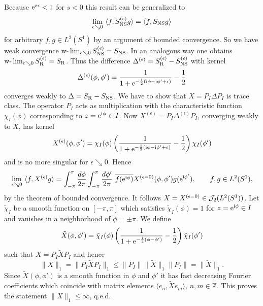 \documentclass[10pt,a4paper]{article}
\begin{document}
Because ${\rm e}^{s\epsilon}<1$ for $s<0$ this result
can be generalized to
\[ \lim_{\epsilon\searrow 0} \,\,
\langle f, S_{\rm NS}^{(\epsilon)} g \rangle =
\langle f, S_{\rm NS} g \rangle \]
for arbitrary $f,g \in L^2(S^1)$ by an argument
of bounded convergence. So we have weak convergence
$\mbox{w-}\lim_{\epsilon\searrow 0}
S_{\rm NS}^{(\epsilon)}=S_{\rm NS}$. In an
analogous way one obtains
$\mbox{w-}\lim_{\epsilon\searrow 0}
S_{\rm R}^{(\epsilon)}=S_{\rm R}$. Thus the
difference $\Delta^{(\epsilon)}=
S_{\rm R}^{(\epsilon)}-S_{\rm NS}^{(\epsilon)}$
with kernel
\[ \Delta^{(\epsilon)}(\phi,\phi')=
\frac{1}{1+{\rm e}^{-\frac{1}{2}({\rm i}\phi-{\rm i}\phi'+\epsilon)}}-
\frac{1}{2} \]
converges weakly to $\Delta=S_{\rm R}-S_{\rm NS}$.
We have to show that $X=P_I\Delta P_I$ is trace class.
The operator $P_I$ acts as multiplication with
the characteristic function $\chi_I(\phi)$
corresponding to $z={\rm e}^{{\rm i}\phi}\in I$. Now
$X^{(\epsilon)}=P_I \Delta^{(\epsilon)} P_I$,
converging weakly to $X$, has kernel
\[ X^{(\epsilon)}(\phi,\phi')= \chi_I(\phi) \left(
\frac{1}{1+{\rm e}^{-\frac{1}{2}({\rm i}\phi-{\rm i}\phi'+\epsilon)}}-
\frac{1}{2} \right) \chi_I(\phi') \]
and is no more singular for $\epsilon\searrow 0$. Hence
\[ \lim_{\epsilon\searrow 0}\,\,
\langle f, X^{(\epsilon)} g \rangle
= \int_{-\pi}^\pi \frac{d\phi}{2\pi}
\int_{-\pi}^\pi \frac{d\phi'}{2\pi} \,\,
\overline{f({\rm e}^{{\rm i}\phi})} X^{(\epsilon=0)}(\phi,\phi')
g({\rm e}^{{\rm i}\phi'}), \qquad f,g\in L^2(S^1), \]
by the theorem of bounded convergence. It follows
$X=X^{(\epsilon=0)}\in{\cal J}_2(L^2(S^1))$.
Let $\tilde{\chi}_I$ be a smooth function on
$[-\pi,\pi]$ which satisfies $\tilde{\chi}_I(\phi)=1$
for $z={\rm e}^{{\rm i}\phi}\in I$ and vanishes
in a neighborhood of $\phi=\pm\pi$. We define
\[ \tilde{X}(\phi,\phi')=\tilde{\chi}_I(\phi)
\left( \frac{1}{1+{\rm e}^{-\frac{{\rm i}}{2}(\phi-\phi')}}
-\frac{1}{2} \right) \tilde{\chi}_I(\phi') \]
such that $X=P_I\tilde{X}P_I$ and hence
\[ \|X\|_1=\|P_I\tilde{X}P_I\|_1 \le \|P_I \|
\|\tilde{X}\|_1 \|P_I\| = \|\tilde{X}\|_1. \]
Since $\tilde{X}(\phi,\phi')$ is a smooth function
in $\phi$ and $\phi'$ it has fast decreasing
Fourier coefficients which coincide with matrix
elements $\langle e_n,\tilde{X} e_m \rangle$,
$n,m\in\mathbb{Z}$. This proves the statement
$\|X\|_1\le\infty$, q.e.d.
\end{document}
